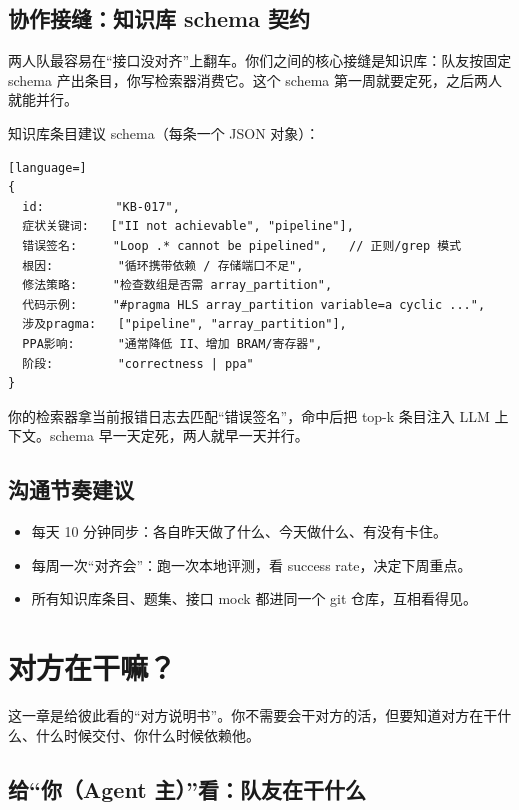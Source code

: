 \documentclass[12pt,a4paper]{ctexbook}
\begin{document}
\section{协作接缝：知识库 schema 契约}

两人队最容易在“接口没对齐”上翻车。你们之间的核心接缝是知识库：队友按固定 schema 产出条目，你写检索器消费它。这个 schema 第一周就要定死，之后两人就能并行。

知识库条目建议 schema（每条一个 JSON 对象）：

\begin{lstlisting}[language=]
{
  id:          "KB-017",
  症状关键词:   ["II not achievable", "pipeline"],
  错误签名:     "Loop .* cannot be pipelined",   // 正则/grep 模式
  根因:         "循环携带依赖 / 存储端口不足",
  修法策略:     "检查数组是否需 array_partition",
  代码示例:     "#pragma HLS array_partition variable=a cyclic ...",
  涉及pragma:   ["pipeline", "array_partition"],
  PPA影响:      "通常降低 II、增加 BRAM/寄存器",
  阶段:         "correctness | ppa"
}
\end{lstlisting}

你的检索器拿当前报错日志去匹配“错误签名”，命中后把 top-k 条目注入 LLM 上下文。schema 早一天定死，两人就早一天并行。

\section{沟通节奏建议}

\begin{itemize}
\item 每天 10 分钟同步：各自昨天做了什么、今天做什么、有没有卡住。
\item 每周一次“对齐会”：跑一次本地评测，看 success rate，决定下周重点。
\item 所有知识库条目、题集、接口 mock 都进同一个 git 仓库，互相看得见。
\end{itemize}

\chapter{对方在干嘛？}

这一章是给彼此看的“对方说明书”。你不需要会干对方的活，但要知道对方在干什么、什么时候交付、你什么时候依赖他。

\section{给“你（Agent 主）”看：队友在干什么}
\end{document}

